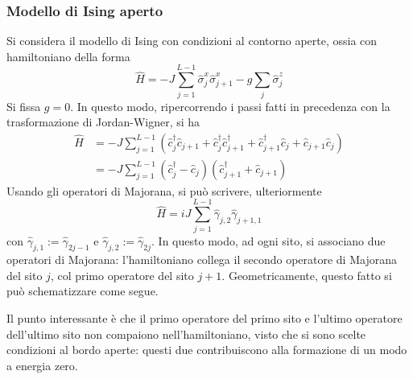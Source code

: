\documentclass[11pt, a4paper]{scrartcl}
\theoremstyle{style}
\theoremstyle{style1}
\numberwithin{equation}{subsection}
\begin{document}
\subsubsection{Modello di Ising aperto}
Si considera il modello di Ising con condizioni al contorno aperte, ossia con hamiltoniano della forma
\[
\hat{H} = - J \sum_{j=1}^{L-1} \hat{\sigma }_j ^x \hat{\sigma }^x _{j+1} - g \sum_{j}^{} \hat{\sigma }_j^z
\] 
Si fissa $g=0$.
In questo modo, ripercorrendo i passi fatti in precedenza con la trasformazione di Jordan-Wigner, si ha
\[
	\begin{split}
		\hat{H}&= - J \sum_{j=1}^{L-1} \left(\hat{c}^\dagger _j \hat{c}_{j+1} + \hat{c}_j^\dagger \hat{c}^\dagger _{j+1} + \hat{c}^\dagger _{j+1} \hat{c}_j + \hat{c}_{j+1} \hat{c}_j\right) \\
		       &= -J \sum_{j=1}^{L-1} \left(\hat{c}^\dagger _j - \hat{c}_j\right) \left(\hat{c}^\dagger _{j+1} + \hat{c}_{j+1} \right) 
	\end{split}
\] 
Usando gli operatori di Majorana, si pu\`o scrivere, ulteriormente
\[
\hat{H} = i J \sum_{j=1}^{L-1} \hat{\gamma}_{j,2} \hat{\gamma}_{j+1,1} 
\] 
con $\hat{\gamma}_{j,1} := \hat{\gamma}_{2j-1} $ e $\hat{\gamma}_{j,2} := \hat{\gamma}_{2j} $.
In questo modo, ad ogni sito, si associano due operatori di Majorana: l'hamiltoniano collega il secondo operatore di Majorana del sito $j$, col primo operatore del sito $j+1$.
Geometricamente, questo fatto si pu\`o schematizzare come segue.
\begin{center}
\end{center}
Il punto interessante \`e che il primo operatore del primo sito e l'ultimo operatore dell'ultimo sito non compaiono nell'hamiltoniano, visto che si sono scelte condizioni al bordo aperte: questi due contribuiscono alla formazione di un modo a energia zero.
\end{document}
